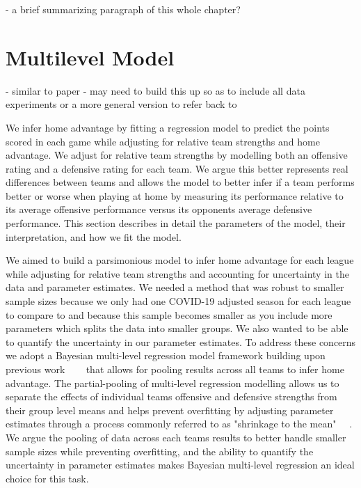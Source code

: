 - a brief summarizing paragraph of this whole chapter?

\section{Multilevel Model} \label{multilevel_model}

- similar to paper
- may need to build this up so as to include all data experiments or a more general version to refer back to

We infer home advantage by fitting a regression model to predict the points scored in each game while adjusting for relative team strengths and home advantage. We adjust for relative team strengths by modelling both an offensive rating and a defensive rating for each team. We argue this better represents real differences between teams and allows the model to better infer if a team performs better or worse when playing at home by measuring its performance relative to its average offensive performance versus its opponents average defensive performance. This section describes in detail the parameters of the model, their interpretation, and how we fit the model.

We aimed to build a parsimonious model to infer home advantage for each league while adjusting for relative team strengths and accounting for uncertainty in the data and parameter estimates. We needed a method that was robust to smaller sample sizes because we only had one COVID-19 adjusted season for each league to compare to and because this sample becomes smaller as you include more parameters which splits the data into smaller groups. We also wanted to be able to quantify the uncertainty in our parameter estimates. To address these concerns we adopt a Bayesian multi-level regression model framework building upon previous work \mbox{\cite{Baio2010} \cite{Glickman1998} \cite{Lopez2018} \cite{Benz2020}} that allows for pooling results across all teams to infer home advantage. The partial-pooling of multi-level regression modelling allows us to separate the effects of individual teams offensive and defensive strengths from their group level means and helps prevent overfitting by adjusting parameter estimates through a process commonly referred to as "shrinkage to the mean" \mbox{\cite{Gelman2014} \cite{Gelman2006} \cite{McElreath2020}}. We argue the pooling of data across each teams results to better handle smaller sample sizes while preventing overfitting, and the ability to quantify the uncertainty in parameter estimates makes Bayesian multi-level regression an ideal choice for this task.

